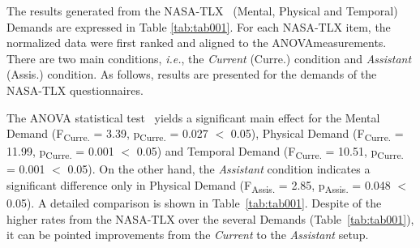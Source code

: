 The results generated from the \ac{NASA-TLX}~\cite{ramkumar2017using, grier2015high} (Mental, Physical and Temporal) Demands are expressed in Table \ref{tab:tab001}.
For each \ac{NASA-TLX} item, the normalized data were first ranked and aligned to the \ac{ANOVA}\footnotemark[27] measurements.
There are two main conditions, {\it i.e.}, the {\it Current} (Curre.) condition and {\it Assistant} (Assis.) condition.
As follows, results are presented for the demands of the \ac{NASA-TLX} questionnaires.




The \ac{ANOVA} statistical test~\cite{Wobbrock:2011:ART:1978942.1978963, mathews2017usability} yields a significant main effect for the Mental Demand (F\textsubscript{Curre.} = 3.39, p\textsubscript{Curre.} = 0.027 $<$ 0.05), Physical Demand (F\textsubscript{Curre.} = 11.99, p\textsubscript{Curre.} = 0.001 $<$ 0.05) and Temporal Demand (F\textsubscript{Curre.} = 10.51, p\textsubscript{Curre.} = 0.001 $<$ 0.05).
On the other hand, the {\it Assistant} condition indicates a significant difference only in Physical Demand (F\textsubscript{Assis.} = 2.85, p\textsubscript{Assis.} = 0.048 $<$ 0.05). A detailed comparison is shown in Table~\ref{tab:tab001}.
Despite of the higher rates from the \ac{NASA-TLX} over the several Demands (Table~\ref{tab:tab001}), it can be pointed improvements from the {\it Current} to the {\it Assistant} setup.

